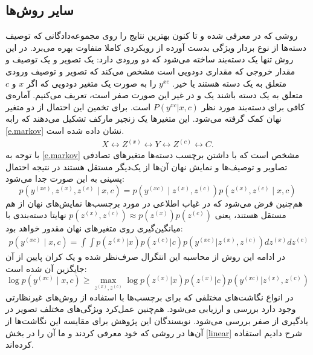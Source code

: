 \subsection{سایر روش‌ها}\label{other}
روشی که در \cite{ agnostic}  معرفی شده و تا کنون بهترین نتایج را روی مجموعه‌دادگانی که توصیف دسته‌ها از نوع بردار ویژگی بدست آورده از رویکردی کاملا متفاوت بهره می‌برد. در این روش تنها یک دسته‌بند ساخته می‌شود که دو ورودی دارد: یک تصویر و یک توصیف و مقدار خروجی که مقداری دودویی است مشخص می‌کند که تصویر و توصیف ورودی متعلق به یک دسته هستند یا خیر. $y^{xc}$ را به صورت یک متغیر دودویی که اگر $x$ و $c$ متعلق به یک دسته باشند یک و در غیر این صورت صفر است، تعریف می‌کنیم. آماره‌ی کافی برای دسته‌بند مورد نظر $ P(y^{xc} | x,c)$ است. برای تخمین این احتمال از دو متغیر نهان کمک گرفته می‌شود. این متغیرها یک زنجیر مارکف تشکیل می‌دهند که رابه \eqref{e.markov} نشان داده شده است. 
\begin{align} \label{e.markov}
X \leftrightarrow Z^{(x)} \leftrightarrow Y  \leftrightarrow Z^{(c)} \leftrightarrow C.
\end{align}
با توجه به \eqref{e.markov} مشخص است که با داشتن برچسب دسته‌ها متغیرهای تصادفی تصاویر و توصیف‌ها و نمایش نهان آن‌ها از یک‌دیگر مستقل هستند در نتیجه احتمال پسینی به این صورت جدا می‌شود: 
\begin{equation}
p(y^{(xc)}, {z}^{(x)}, {z}^{(c)} \mid {x}, {c}) = p(y^{(xc)} \mid {z}^{(x)}, {z}^{(c)}) p({z}^{(x)}, {z}^{(c)} \mid {x}, {c}) \nonumber
\end{equation}
هم‌چنین فرض می‌شود که در غیاب اطلاعی در مورد برچسب‌ها نمایش‌های نهان از هم مستقل هستند، یعنی
  $p({z}^{(x)}, {z}^{(c)}) \approx p({z}^{(x)})p({z}^{(c)})$
نهایتا دسته‌بندی با میانگین‌گیری روی متغیرهای نهان مقدور خواهد بود:
\begin{align} \label{eqn:p} 
p( y^{(xc)} \mid {x}, {c})
=\int\int p({z}^{(x)}|{x})p({z}^{(c)}|{c})p(y^{(xc)}|{z}^{(x)}, {z}^{(c)})d{z}^{(x)}d{z}^{(c)} 
\end{align}
در ادامه این روش از محاسبه این انتگرال صرف‌نظر شده و یک کران پایین از آن جایگزین آن شده است:
\begin{equation}\label{eqn:lb}
\log p( y^{(xc)} \mid x, c) 
 \geq \max_{{z}^{(x)},{z}^{(c)}}  \log p({z}^{(x)}|x)p({z}^{(x)}|c)p(y^{(xc)}|{z}^{(x)}, {z}^{(c)})
\end{equation}
 در \cite{Akata2015} انواع نگاشت‌های مختلفی که برای برچسب‌ها با استفاده از روش‌های غیرنظارتی وجود دارد بررسی و ارزیابی می‌شود. هم‌چنین عمل‌کرد ویژگی‌های مختلف تصویر در یادگیری از صفر بررسی می‌شود. نویسندگان این پژوهش برای مقایسه این نگاشت‌ها از آن‌ها در روشی که خود معرفی کردند \cite{ akata13} و ما آن را در بخش \ref{linear} شرح دادیم استفاده کرده‌اند. 
 
